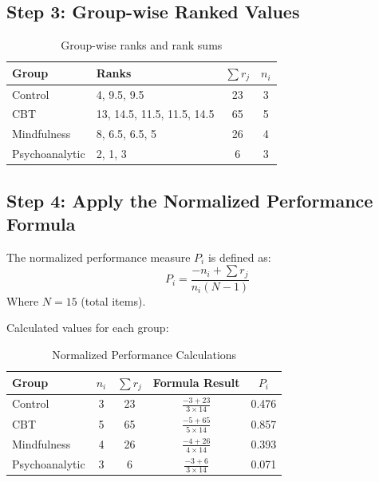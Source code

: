 \documentclass[a4paper,fleqn,review]{cas-sc}
\begin{document}
\subsection*{Step 3: Group-wise Ranked Values}

\begin{table}[!htbp]
	\centering
	\renewcommand{\arraystretch}{1.3}
	\begin{tabular}{|l|l|c|c|}
		\hline
		\textbf{Group} & \textbf{Ranks} & $\sum r_j$ & $n_i$ \\
		\hline
		Control & 4, 9.5, 9.5 & 23 & 3 \\
		CBT & 13, 14.5, 11.5, 11.5, 14.5 & 65 & 5 \\
		Mindfulness & 8, 6.5, 6.5, 5 & 26 & 4 \\
		Psychoanalytic & 2, 1, 3 & 6 & 3 \\
		\hline
	\end{tabular}
	\caption{Group-wise ranks and rank sums}
\end{table}

\vspace{1em}

\subsection*{Step 4: Apply the Normalized Performance Formula}

The normalized performance measure $P_i$ is defined as:
\[
P_i = \frac{-n_i + \sum r_j}{n_i (N - 1)}
\]
Where $N = 15$ (total items).

\vspace{0.5em}

\noindent Calculated values for each group:

\begin{table}[!htbp]
	\centering
	\renewcommand{\arraystretch}{1.3}
	\begin{tabular}{|l|c|c|c|c|}
		\hline
		\textbf{Group} & $n_i$ & $\sum r_j$ & Formula Result & $P_i$ \\
		\hline
		Control & 3 & 23 & $\frac{-3 + 23}{3 \times 14}$ & 0.476 \\
		CBT & 5 & 65 & $\frac{-5 + 65}{5 \times 14}$ & 0.857 \\
		Mindfulness & 4 & 26 & $\frac{-4 + 26}{4 \times 14}$ & 0.393 \\
		Psychoanalytic & 3 & 6 & $\frac{-3 + 6}{3 \times 14}$ & 0.071 \\
		\hline
	\end{tabular}
	\caption{Normalized Performance Calculations}
\end{table}
\end{document}
